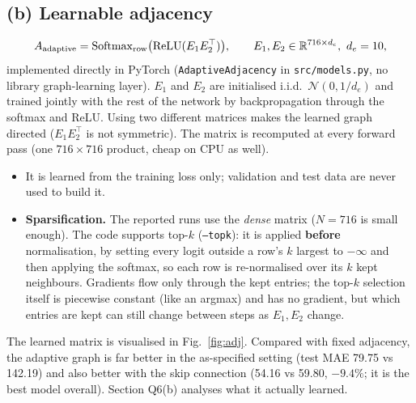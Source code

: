 \subsection*{(b) Learnable adjacency}
\[
A_{\text{adaptive}}=\mathrm{Softmax}_{\text{row}}\big(\mathrm{ReLU}(E_1E_2^\top)\big),\qquad E_1,E_2\in\mathbb{R}^{716\times d_e},\ d_e=10,
\]
implemented directly in PyTorch (\texttt{AdaptiveAdjacency} in \texttt{src/models.py}, no library graph-learning layer).
$E_1$ and $E_2$ are initialised i.i.d.\ $\mathcal N(0,1/d_e)$ and trained jointly with the rest of the network by backpropagation
through the softmax and ReLU. Using two different matrices makes the learned graph directed ($E_1E_2^\top$ is not symmetric). The
matrix is recomputed at every forward pass (one $716\times716$ product, cheap on CPU as well).
\begin{itemize}
\item It is learned from the training loss only; validation and test data are never used to build it.
\item \textbf{Sparsification.} The reported runs use the \emph{dense} matrix ($N=716$ is small enough). The code supports top-$k$
(\texttt{--topk}): it is applied \textbf{before} normalisation, by setting every logit outside a row's $k$ largest to $-\infty$
and then applying the softmax, so each row is re-normalised over its $k$ kept neighbours. Gradients flow only through the
kept entries; the top-$k$ selection itself is piecewise constant (like an argmax) and has no gradient, but which entries
are kept can still change between steps as $E_1,E_2$ change.
\end{itemize}
The learned matrix is visualised in Fig.~\ref{fig:adj}. Compared with fixed adjacency, the adaptive graph is far better in the
as-specified setting (test MAE 79.75 vs 142.19) and also better with the skip connection (54.16 vs 59.80, $-9.4\%$; it is the best
model overall). Section Q6(b) analyses what it actually learned.

